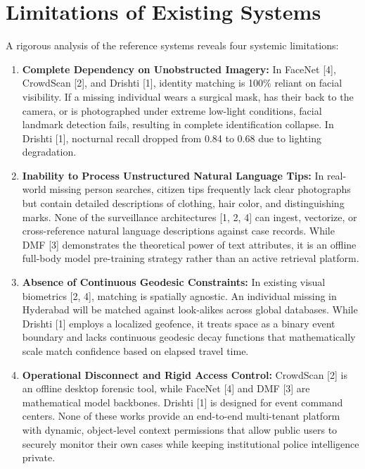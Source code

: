 \documentclass[12pt,a4paper]{report}
\begin{document}
\section{Limitations of Existing Systems}
A rigorous analysis of the reference systems reveals four systemic limitations:
\begin{enumerate}
    \item \textbf{Complete Dependency on Unobstructed Imagery:} In FaceNet [4], CrowdScan [2], and Drishti [1], identity matching is 100\% reliant on facial visibility. If a missing individual wears a surgical mask, has their back to the camera, or is photographed under extreme low-light conditions, facial landmark detection fails, resulting in complete identification collapse. In Drishti [1], nocturnal recall dropped from 0.84 to 0.68 due to lighting degradation.
    \item \textbf{Inability to Process Unstructured Natural Language Tips:} In real-world missing person searches, citizen tips frequently lack clear photographs but contain detailed descriptions of clothing, hair color, and distinguishing marks. None of the surveillance architectures [1, 2, 4] can ingest, vectorize, or cross-reference natural language descriptions against case records. While DMF [3] demonstrates the theoretical power of text attributes, it is an offline full-body model pre-training strategy rather than an active retrieval platform.
    \item \textbf{Absence of Continuous Geodesic Constraints:} In existing visual biometrics [2, 4], matching is spatially agnostic. An individual missing in Hyderabad will be matched against look-alikes across global databases. While Drishti [1] employs a localized geofence, it treats space as a binary event boundary and lacks continuous geodesic decay functions that mathematically scale match confidence based on elapsed travel time.
    \item \textbf{Operational Disconnect and Rigid Access Control:} CrowdScan [2] is an offline desktop forensic tool, while FaceNet [4] and DMF [3] are mathematical model backbones. Drishti [1] is designed for event command centers. None of these works provide an end-to-end multi-tenant platform with dynamic, object-level context permissions that allow public users to securely monitor their own cases while keeping institutional police intelligence private.
\end{enumerate}
\end{document}
